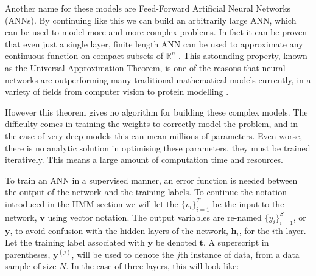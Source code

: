 \documentclass[bsc,singlespacing,logo, parskip, deptreport]{infthesis}
\begin{document}
Another name for these models are Feed-Forward Artificial Neural Networks (ANNs). By continuing like this we can build an arbitrarily large ANN, which can be used to model more and more complex problems. In fact it can be proven that even just a single layer, finite length ANN can be used to approximate any continuous function on compact subsets of ${\mathbb R}^n$ \cite{cybenko1989approximation}\cite{hornik1989multilayer}. This astounding property, known as the Universal Approximation Theorem, is one of the reasons that neural networks are outperforming many traditional mathematical models currently, in a variety of fields from computer vision \cite{krizhevsky2012imagenet} to protein modelling \cite{uziela2017proq3d}.

However this theorem gives no algorithm for building these complex models. The difficulty comes in training the weights to correctly model the problem, and in the case of very deep models this can mean millions of parameters. Even worse, there is no analytic solution in optimising these parameters, they must be trained iteratively. This means a large amount of computation time and resources.

To train an ANN in a supervised manner, an error function is needed between the output of the network and the training labels. To continue the notation introduced in the HMM section we will let the $\{v_i\}_{i=1}^{T}$ be the input to the network, $\bm{v}$ using vector notation. The output variables are re-named $\{y_i\}_{i=1}^{S}$, or $\bm{y}$, to avoid confusion with the hidden layers of the network, $\bm{h}_i$, for the $i$th layer. Let the training label associated with $\bm{y}$ be denoted $\bm{t}$. A superscript in parentheses, $\bm{y}^{(j)}$, will be used to denote the $j$th instance of data, from a data sample of size $N$. In the case of three layers, this will look like:

\begin{center}
\end{center}
\end{document}
